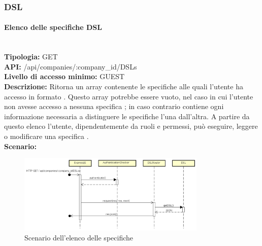 \newpage
\subsubsection{DSL}
\paragraph{Elenco delle specifiche DSL}\mbox{}\\
\textbf{Tipologia:} GET \\
\textbf{API:} /api/companies/:company\_id/DSLs \\
\textbf{Livello di accesso minimo:} GUEST \\
\textbf{Descrizione:} Ritorna un array contenente le specifiche  alle quali l'utente ha accesso in formato . Questo array potrebbe essere vuoto, nel caso in cui l'utente non avesse accesso a nessuna specifica ; in caso contrario contiene ogni informazione necessaria a distinguere le specifiche l'una dall'altra. A partire da questo elenco l'utente, dipendentemente da ruoli e permessi, può eseguire, leggere o modificare una specifica . \\
\textbf{Scenario:} 
\begin{figure}[H]
\centering
\includegraphics[width=0.8\textwidth]{res/sections/backend/sequence/(GET)dsl.png}
\caption{Scenario dell'elenco delle specifiche }
\end{figure}

\newpage
